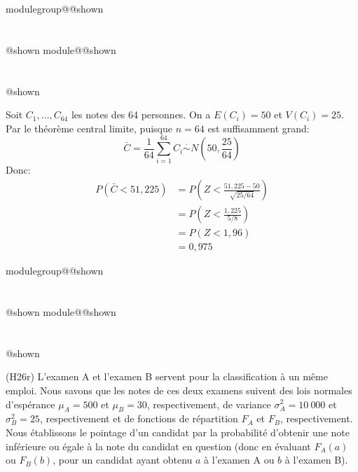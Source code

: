 \documentclass{Evaluation}
\makeatletter
\newcommand{\currentmodulekey}{}
\newcommand{\currentmoduletitle}{}
\newcommand{\currentgroupkey}{}
\newcommand{\currentgrouptitle}{}
\newcommand{\showmoduleifneeded}{%
  \ifx\currentgroupkey\empty\else
    \expandafter\ifx\csname modulegroup@\currentgroupkey @shown\endcsname\relax
      \section*{\currentgrouptitle}%
      \expandafter\gdef\csname modulegroup@\currentgroupkey @shown\endcsname{1}%
    \fi
  \fi
  \expandafter\ifx\csname module@\currentmodulekey @shown\endcsname\relax
    \section*{\currentmoduletitle}%
    \expandafter\gdef\csname module@\currentmodulekey @shown\endcsname{1}%
  \fi
}
\newenvironment{H26}{\showmoduleifneeded}{}
\newenvironment{H26r}{\showmoduleifneeded}{}
\makeatother
\begin{document}
\begin{questions}
\begin{H26}
\begin{parts}
\begin{solution}
    Soit $C_1,\hdots,C_{64}$ les notes des 64 personnes. On a $E(C_i)=50$ et $V(C_i)=25$. Par le théorème central limite, puisque $n=64$ est suffisamment grand:
    $$\bar{C}=\frac{1}{64}\sum_{i=1}^{64}C_i \stackrel{\cdot}{\sim} N\left(50,\frac{25}{64}\right)$$
    Donc:
    \begin{align*}
        P(\bar{C}<51{,}225)&=P\left(Z<\frac{51{,}225-50}{\sqrt{25/64}}\right)\\
        &= P\left(Z<\frac{1{,}225}{5/8}\right)\\
        &= P(Z<1{,}96)\\
        &= 0{,}975
    \end{align*}
\end{solution}
\end{parts}
\end{H26}

\begin{H26r}
\question
(H26r)
L'examen A et l'examen B servent pour la classification à un même emploi. 
Nous savons que les notes de ces deux examens suivent des lois normales d'espérance $\mu_{A}=500$ et $\mu_{B}=30$, respectivement, de variance $\sigma^2_{A}=10\ 000$ et $\sigma^2_{B}=25$, respectivement et de fonctions de répartition $F_A$ et $F_B$, respectivement.
Nous établissons le pointage d'un candidat par la probabilité d'obtenir une note inférieure ou égale à la note du candidat en question (donc en évaluant $F_A(a)$ ou $F_B(b)$, pour un candidat ayant obtenu $a$ à l'examen A ou $b$ à l'examen B). 

\vspace{0.5cm}
\end{H26r}
\end{questions}
\end{document}
